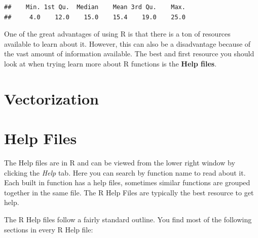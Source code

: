 \documentclass[
]{book}
\begin{document}
\begin{verbatim}
##    Min. 1st Qu.  Median    Mean 3rd Qu.    Max. 
##     4.0    12.0    15.0    15.4    19.0    25.0
\end{verbatim}

One of the great advantages of using R is that there is a ton of resources available to learn about it. However, this can also be a disadvantage because of the vast amount of information available. The best and first resource you should look at when trying learn more about R functions is the \textbf{Help files}.

\hypertarget{vectorization}{%
\section{Vectorization}\label{vectorization}}

\hypertarget{help-files}{%
\section{Help Files}\label{help-files}}

The Help files are in R and can be viewed from the lower right window by clicking the \emph{Help} tab. Here you can search by function name to read about it. Each built in function has a help files, sometimes similar functions are grouped together in the same file. The R Help Files are typically the best resource to get help.

The R Help files follow a fairly standard outline. You find most of the following sections in every R Help file:
\end{document}
